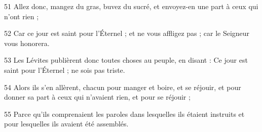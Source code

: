 \par 51 Allez donc, mangez du gras, buvez du sucré, et envoyez-en une part à ceux qui n'ont rien ;
\par 52 Car ce jour est saint pour l'Éternel ; et ne vous affligez pas ; car le Seigneur vous honorera.
\par 53 Les Lévites publièrent donc toutes choses au peuple, en disant : Ce jour est saint pour l'Éternel ; ne sois pas triste.
\par 54 Alors ils s'en allèrent, chacun pour manger et boire, et se réjouir, et pour donner sa part à ceux qui n'avaient rien, et pour se réjouir ;
\par 55 Parce qu'ils comprenaient les paroles dans lesquelles ils étaient instruits et pour lesquelles ils avaient été assemblés.

